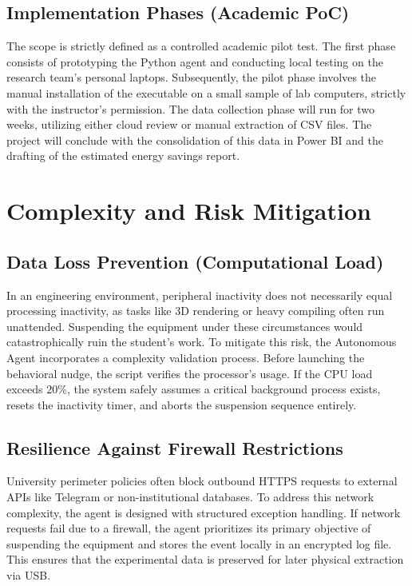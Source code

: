 \documentclass[conference]{IEEEtran}
\begin{document}
\subsection{Implementation Phases (Academic PoC)}
The scope is strictly defined as a controlled academic pilot test. The first phase consists of prototyping the Python agent and conducting local testing on the research team's personal laptops. Subsequently, the pilot phase involves the manual installation of the executable on a small sample of lab computers, strictly with the instructor's permission. The data collection phase will run for two weeks, utilizing either cloud review or manual extraction of CSV files. The project will conclude with the consolidation of this data in Power BI and the drafting of the estimated energy savings report.

\section{Complexity and Risk Mitigation}

\subsection{Data Loss Prevention (Computational Load)}
In an engineering environment, peripheral inactivity does not necessarily equal processing inactivity, as tasks like 3D rendering or heavy compiling often run unattended. Suspending the equipment under these circumstances would catastrophically ruin the student's work. To mitigate this risk, the Autonomous Agent incorporates a complexity validation process. Before launching the behavioral nudge, the script verifies the processor's usage. If the CPU load exceeds $20\%$, the system safely assumes a critical background process exists, resets the inactivity timer, and aborts the suspension sequence entirely.

\subsection{Resilience Against Firewall Restrictions}
University perimeter policies often block outbound HTTPS requests to external APIs like Telegram or non-institutional databases. To address this network complexity, the agent is designed with structured exception handling. If network requests fail due to a firewall, the agent prioritizes its primary objective of suspending the equipment and stores the event locally in an encrypted log file. This ensures that the experimental data is preserved for later physical extraction via USB.
\end{document}

